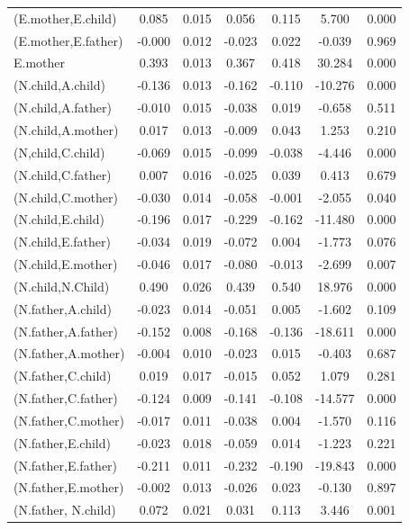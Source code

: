 \documentclass[11pt,a5paper,twoside]{book}
\begin{document}
{{\begin{center}
\begin{longtable}{@{\extracolsep{\fill}}lcccccc@{}}
   (E.mother,E.child)  & 0.085 & 0.015 & 0.056 & 0.115 & 5.700 & 0.000 \\ 
   (E.mother,E.father)  & -0.000 & 0.012 & -0.023 & 0.022 & -0.039 & 0.969 \\ 
   E.mother  & 0.393 & 0.013 & 0.367 & 0.418 & 30.284 & 0.000 \\ 
   (N.child,A.child)  & -0.136 & 0.013 & -0.162 & -0.110 & -10.276 & 0.000 \\ 
   (N.child,A.father)  & -0.010 & 0.015 & -0.038 & 0.019 & -0.658 & 0.511 \\ 
   (N.child,A.mother)  & 0.017 & 0.013 & -0.009 & 0.043 & 1.253 & 0.210 \\ 
  (N,child,C.child)  & -0.069 & 0.015 & -0.099 & -0.038 & -4.446 & 0.000 \\ 
   (N.child,C.father)  & 0.007 & 0.016 & -0.025 & 0.039 & 0.413 & 0.679 \\ 
   (N.child,C.mother)  & -0.030 & 0.014 & -0.058 & -0.001 & -2.055 & 0.040 \\ 
   (N.child,E.child)  & -0.196 & 0.017 & -0.229 & -0.162 & -11.480 & 0.000 \\ 
   (N.child,E.father)  & -0.034 & 0.019 & -0.072 & 0.004 & -1.773 & 0.076 \\ 
   (N.child,E.mother)  & -0.046 & 0.017 & -0.080 & -0.013 & -2.699 & 0.007 \\ 
   (N.child,N.Child)  & 0.490 & 0.026 & 0.439 & 0.540 & 18.976 & 0.000 \\ 
   (N.father,A.child)  & -0.023 & 0.014 & -0.051 & 0.005 & -1.602 & 0.109 \\ 
   (N.father,A.father)  & -0.152 & 0.008 & -0.168 & -0.136 & -18.611 & 0.000 \\ 
   (N.father,A.mother)  & -0.004 & 0.010 & -0.023 & 0.015 & -0.403 & 0.687 \\ 
   (N.father,C.child)  & 0.019 & 0.017 & -0.015 & 0.052 & 1.079 & 0.281 \\ 
   (N.father,C.father)  & -0.124 & 0.009 & -0.141 & -0.108 & -14.577 & 0.000 \\ 
   (N.father,C.mother)  & -0.017 & 0.011 & -0.038 & 0.004 & -1.570 & 0.116 \\ 
   (N.father,E.child)  & -0.023 & 0.018 & -0.059 & 0.014 & -1.223 & 0.221 \\ 
   (N.father,E.father)  & -0.211 & 0.011 & -0.232 & -0.190 & -19.843 & 0.000 \\ 
   (N.father,E.mother)  & -0.002 & 0.013 & -0.026 & 0.023 & -0.130 & 0.897 \\ 
   (N.father, N.child)  & 0.072 & 0.021 & 0.031 & 0.113 & 3.446 & 0.001 \\ 

\end{longtable}
\end{center}}}
\end{document}
